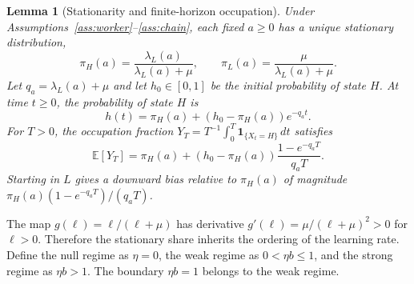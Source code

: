 \documentclass[11pt]{article}
\newtheorem{lemma}{Lemma}
\theoremstyle{definition}
\newcommand{\lam}{\lambda_L}
\newcommand{\share}{\pi_H}
\begin{document}
\begin{lemma}[Stationarity and finite-horizon occupation]\label{lem:stationary}
Under Assumptions~\ref{ass:worker}--\ref{ass:chain}, each fixed $a\geq0$
has a unique stationary distribution,
\begin{equation}\label{eq:stationary}
 \share(a)=\frac{\lam(a)}{\lam(a)+\mu},\qquad
 \pi_L(a)=\frac{\mu}{\lam(a)+\mu}.
\end{equation}
Let $q_a=\lam(a)+\mu$ and let $h_0\in[0,1]$ be the initial probability
of state $H$. At time $t\geq0$, the probability of state $H$ is
\begin{equation}\label{eq:transient}
 h(t)=\share(a)+(h_0-\share(a))e^{-q_at}.
\end{equation}
For $T>0$, the occupation fraction
$Y_T=T^{-1}\int_0^T\mathbf{1}_{\{X_t=H\}}\,dt$ satisfies
\begin{equation}\label{eq:occupation}
 \mathbb E[Y_T]=\share(a)+(h_0-\share(a))
                       \frac{1-e^{-q_aT}}{q_a T}.
\end{equation}
Starting in $L$ gives a downward bias relative to $\share(a)$ of
magnitude $\share(a)(1-e^{-q_aT})/(q_a T)$.
\end{lemma}

The map $g(\ell)=\ell/(\ell+\mu)$ has derivative
$g'(\ell)=\mu/(\ell+\mu)^2>0$ for $\ell>0$. Therefore the stationary share
inherits the ordering of the learning rate. Define the null regime as
$\eta=0$, the weak regime as $0<\eta b\leq1$, and the strong regime as
$\eta b>1$. The boundary $\eta b=1$ belongs to the weak regime.
\end{document}
